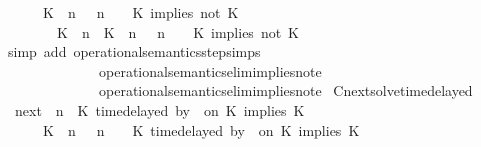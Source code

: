\begin{isabellebody}
\ \ \ \ {\isasymsupseteq}\ {\isacharbraceleft}\ {\isacharparenleft}{\isacharparenleft}K\ {\isasymnot}{\isasymUp}\ n{\isacharparenright}\ {\isacharhash}\ {\isasymGamma}{\isacharparenright}{\isacharcomma}\ n\ {\isasymturnstile}\ {\isasymPsi}\ {\isasymtriangleright}\ {\isacharparenleft}{\isacharparenleft}K\ implies\ not\ K\ {\isacharhash}\ {\isasymPhi}{\isacharparenright}{\isacharcomma}\isanewline
\ \ \ \ \ \ \ \ {\isacharparenleft}{\isacharparenleft}K\ {\isasymUp}\ n{\isacharparenright}\ {\isacharhash}\ {\isacharparenleft}K\ {\isasymnot}{\isasymUp}\ n{\isacharparenright}\ {\isacharhash}\ {\isasymGamma}{\isacharparenright}{\isacharcomma}\ n\ {\isasymturnstile}\ {\isasymPsi}\ {\isasymtriangleright}\ {\isacharparenleft}{\isacharparenleft}K\ implies\ not\ K\ {\isacharhash}\ {\isasymPhi}{\isacharparenright}\ {\isacharbraceright}{\isacartoucheclose}\isanewline
%
\isadelimproof
%
\endisadelimproof
%
\isatagproof
{}\isamarkupfalse%
\ {\isacharparenleft}simp\ add{\isacharcolon}\ operational{\isacharunderscore}semantics{\isacharunderscore}step{\isachardot}simps\isanewline
\ \ \ \ \ \ \ \ \ \ \ \ \ \ operational{\isacharunderscore}semantics{\isacharunderscore}elim{\isachardot}implies{\isacharunderscore}not{\isacharunderscore}e{}\isanewline
\ \ \ \ \ \ \ \ \ \ \ \ \ \ operational{\isacharunderscore}semantics{\isacharunderscore}elim{\isachardot}implies{\isacharunderscore}not{\isacharunderscore}e{}{\isacharparenright}%
\endisatagproof
{\isafoldproof}%
%
\isadelimproof
\isanewline
%
\endisadelimproof
\isanewline
{}\isamarkupfalse%
\ Cnext{\isacharunderscore}solve{\isacharunderscore}timedelayed{\isacharcolon}\isanewline
\ \ {\isacartoucheopen}{\isacharparenleft}{\isasymC}\isactrlsub n\isactrlsub e\isactrlsub x\isactrlsub t\ {\isacharparenleft}{\isasymGamma}{\isacharcomma}\ n\ {\isasymturnstile}\ {\isacharparenleft}{\isacharparenleft}K\ time{\isacharminus}delayed\ by\ {\isasymdelta}{\isasymtau}\ on\ K\ implies\ K\ {\isacharhash}\ {\isasymPsi}{\isacharparenright}\ {\isasymtriangleright}\ {\isasymPhi}{\isacharparenright}{\isacharparenright}\isanewline
\ \ \ \ {\isasymsupseteq}\ {\isacharbraceleft}\ {\isacharparenleft}{\isacharparenleft}K\ {\isasymnot}{\isasymUp}\ n{\isacharparenright}\ {\isacharhash}\ {\isasymGamma}{\isacharparenright}{\isacharcomma}\ n\ {\isasymturnstile}\ {\isasymPsi}\ {\isasymtriangleright}\ {\isacharparenleft}{\isacharparenleft}K\ time{\isacharminus}delayed\ by\ {\isasymdelta}{\isasymtau}\ on\ K\ implies\ K\ {\isacharhash}\ {\isasymPhi}{\isacharparenright}{\isacharcomma}\isanewline

\end{isabellebody}

